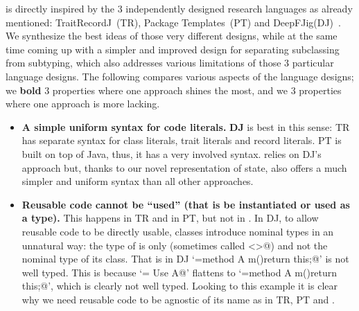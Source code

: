 \name is directly inspired by the $3$ independently designed research languages as already mentioned:
 TraitRecordJ~(TR)\cite{Bettini:2010:ISP:1774088.1774530}, Package Templates~(PT)\cite{KrogdahlMS09} and DeepFJig(DJ)~\cite{deep}.
We synthesize
the best ideas of those very different designs, while at the same time 
coming up with a simpler and improved design for separating
subclassing from subtyping, which also addresses various limitations of those
$3$ particular language designs.
The following compares 
various aspects of the language designs;
we \textbf{bold} $3$ properties where one approach shines the most,
 and we  $3$ properties where one approach is more lacking.
\begin{itemize}
\item {\bf A simple uniform syntax for code literals.}
\textbf{DJ} is best in this sense: TR has separate syntax for class literals, trait literals and record literals.
PT is built on top of Java, thus, it has a very
involved syntax.
\name relies on DJ's approach but,
thanks to our novel representation of state, \name also offers a much simpler and uniform syntax than
all other approaches.
\item 
{\bf Reusable code cannot be ``used'' (that is be instantiated or used as a type).}
This happens in TR and in PT, but not in . In DJ, to allow reusable code to be directly 
usable, 
classes introduce nominal types in an unnatural way: the type of
\Q@this@ is only \Q@This@ (sometimes called \Q@<>@) and not the
nominal type of its class. 
That is in DJ 
`\Q@A={method A m(){return this;}}@' is not well typed. This is because
`\Q@B= Use A@' flattens to `\Q@B={method A m(){return this;}}@', which is clearly not well typed.
Looking to this example it is clear why we need reusable code to be agnostic of its name as in  TR, PT and \name.


\end{itemize}
